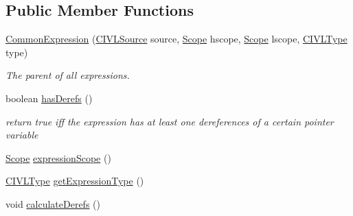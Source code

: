 \subsection*{Public Member Functions}
\begin{DoxyCompactItemize}
\item 
\hypertarget{classedu_1_1udel_1_1cis_1_1vsl_1_1civl_1_1model_1_1common_1_1expression_1_1CommonExpression_ab7d040619522a34abab09da46b10612c}{}\hyperlink{classedu_1_1udel_1_1cis_1_1vsl_1_1civl_1_1model_1_1common_1_1expression_1_1CommonExpression_ab7d040619522a34abab09da46b10612c}{Common\+Expression} (\hyperlink{interfaceedu_1_1udel_1_1cis_1_1vsl_1_1civl_1_1model_1_1IF_1_1CIVLSource}{C\+I\+V\+L\+Source} source, \hyperlink{interfaceedu_1_1udel_1_1cis_1_1vsl_1_1civl_1_1model_1_1IF_1_1Scope}{Scope} hscope, \hyperlink{interfaceedu_1_1udel_1_1cis_1_1vsl_1_1civl_1_1model_1_1IF_1_1Scope}{Scope} lscope, \hyperlink{interfaceedu_1_1udel_1_1cis_1_1vsl_1_1civl_1_1model_1_1IF_1_1type_1_1CIVLType}{C\+I\+V\+L\+Type} type)\label{classedu_1_1udel_1_1cis_1_1vsl_1_1civl_1_1model_1_1common_1_1expression_1_1CommonExpression_ab7d040619522a34abab09da46b10612c}

\begin{DoxyCompactList}\small\item\em The parent of all expressions. \end{DoxyCompactList}\item 
boolean \hyperlink{classedu_1_1udel_1_1cis_1_1vsl_1_1civl_1_1model_1_1common_1_1expression_1_1CommonExpression_a057da96e5d47d11c904a24fa5da3052f}{has\+Derefs} ()
\begin{DoxyCompactList}\small\item\em return true iff the expression has at least one dereferences of a certain pointer variable \end{DoxyCompactList}\item 
\hyperlink{interfaceedu_1_1udel_1_1cis_1_1vsl_1_1civl_1_1model_1_1IF_1_1Scope}{Scope} \hyperlink{classedu_1_1udel_1_1cis_1_1vsl_1_1civl_1_1model_1_1common_1_1expression_1_1CommonExpression_a920b6423022787d40706d933714e1aa4}{expression\+Scope} ()
\item 
\hyperlink{interfaceedu_1_1udel_1_1cis_1_1vsl_1_1civl_1_1model_1_1IF_1_1type_1_1CIVLType}{C\+I\+V\+L\+Type} \hyperlink{classedu_1_1udel_1_1cis_1_1vsl_1_1civl_1_1model_1_1common_1_1expression_1_1CommonExpression_aa867b8cc8ee44aae0d2f0667d27d156a}{get\+Expression\+Type} ()
\item 
\hypertarget{classedu_1_1udel_1_1cis_1_1vsl_1_1civl_1_1model_1_1common_1_1expression_1_1CommonExpression_aefbae79b6ee52408c3e87687c7721e88}{}void \hyperlink{classedu_1_1udel_1_1cis_1_1vsl_1_1civl_1_1model_1_1common_1_1expression_1_1CommonExpression_aefbae79b6ee52408c3e87687c7721e88}{calculate\+Derefs} ()\label{classedu_1_1udel_1_1cis_1_1vsl_1_1civl_1_1model_1_1common_1_1expression_1_1CommonExpression_aefbae79b6ee52408c3e87687c7721e88}


\end{DoxyCompactItemize}

